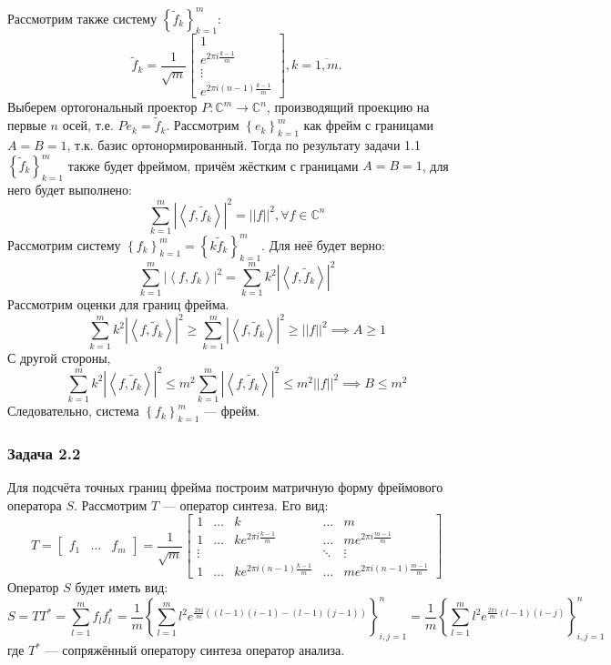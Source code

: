 \documentclass[a4paper,article,10pt]{extarticle}
\begin{document}
Рассмотрим также систему $\left\{\widetilde{f}_k\right\}_{k=1}^m$:
\[
	\widetilde{f}_k = \frac{1}{\sqrt{m}} \begin{bmatrix} 1 \\ e^{2 \pi i \frac{k-1}{m}} \\ \vdots \\ e^{2 \pi i \left(n-1\right) \frac{k-1}{m}}\end{bmatrix}, k=\overline{1,m}.
\]
Выберем ортогональный проектор $P: \mathbb{C}^m \to \mathbb{C}^n$, производящий проекцию на первые $n$ осей, т.е. $P e_k = \widetilde{f}_k$. Рассмотрим $\left\{ e_k \right\}_{k=1}^m$ как фрейм с границами $A=B=1$, т.к. базис ортонормированный. Тогда по результату задачи 1.1 $\left\{ \widetilde{f}_k\right\}_{k=1}^m$ также будет фреймом, причём жёстким с границами $A=B=1$, для него будет выполнено:
\[
	\sum_{k=1}^m \left| \left< f, \widetilde{f}_k \right> \right|^2 = \left| \left| f \right| \right|^2, \forall f \in \mathbb{C}^n
\]
Рассмотрим систему $\left\{f_k\right\}_{k=1}^m=\left\{k \widetilde{f}_k\right\}_{k=1}^m$. Для неё будет верно:
\[
	\sum_{k=1}^m \left| \left< f, f_k\right> \right|^2 = \sum_{k=1}^m k^2 \left| \left< f, \widetilde{f}_k\right>\right|^2 
\]
Рассмотрим оценки для границ фрейма.
\[
	\sum_{k=1}^m k^2 \left| \left< f, \widetilde{f}_k \right> \right|^2 \ge \sum_{k=1}^m \left| \left< f, \widetilde{f}_k \right> \right|^2 \ge \left| \left| f \right| \right|^2 \implies A \ge 1
\]
С другой стороны,
\[
	\sum_{k=1}^m k^2 \left| \left< f, \widetilde{f}_k \right> \right|^2 \le m^2 \sum_{k=1}^m \left| \left< f, \widetilde{f}_k \right> \right|^2 \le m^2 \left| \left| f \right| \right|^2 \implies B \le m^2
\]
Следовательно, система $\left\{ f_k\right\}_{k=1}^m$ --- фрейм.
\subsubsection{Задача 2.2}
Для подсчёта точных границ фрейма построим матричную форму фреймового оператора $S$. Рассмотрим $T$ --- оператор синтеза. Его вид:
\[
	T = \begin{bmatrix} f_1 & \dots & f_m \end{bmatrix} = \frac{1}{\sqrt{m}}\begin{bmatrix} 
			1 & \dots & k & \dots & m \\
			1 & \dots & k e^{2 \pi i \frac{k-1}{m}} & \dots & m e^{2 \pi i \frac{m-1}{m}} \\
			\vdots & & & \ddots & \vdots \\
			1 & \dots & k e^{2 \pi i \left(n-1\right) \frac{k-1}{m}} & \dots & m e^{2 \pi i \left(n-1\right) \frac{m-1}{m}} 
		\end{bmatrix}
\]
Оператор $S$ будет иметь вид:
\[
	S = TT^* = \sum_{l=1}^m f_l f_l^* = \frac{1}{m} \left\{\sum_{l=1}^m l^2 e^{\frac{2 \pi i}{m} \left(\left(l-1\right)\left(i-1\right) - \left(l-1\right)\left(j-1\right)\right)}\right\}_{i,j=1}^n = \frac{1}{m} \left\{ \sum_{l=1}^m l^2 e^{\frac{2 \pi i}{m} \left(l-1\right)\left(i-j\right)}\right\}_{i,j=1}^n
\]
где $T^*$ --- сопряжённый оператору синтеза оператор анализа.
\end{document}
